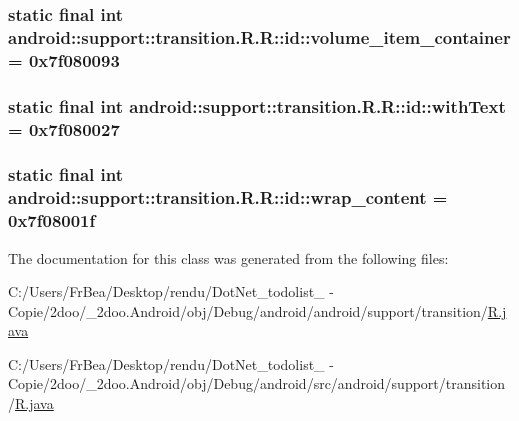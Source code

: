 \hypertarget{classandroid_1_1support_1_1transition_1_1_r_1_1id_21d2d46fae00ff6436e4c0553029a04f}{
\subsubsection[{volume\_\-item\_\-container}]{\setlength{\rightskip}{0pt plus 5cm}static final int android::support::transition.R.R::id::volume\_\-item\_\-container = 0x7f080093}}
\label{classandroid_1_1support_1_1transition_1_1_r_1_1id_21d2d46fae00ff6436e4c0553029a04f}


\hypertarget{classandroid_1_1support_1_1transition_1_1_r_1_1id_6375ca80242632bd4c6af11a41d4195a}{
\subsubsection[{withText}]{\setlength{\rightskip}{0pt plus 5cm}static final int android::support::transition.R.R::id::withText = 0x7f080027}}
\label{classandroid_1_1support_1_1transition_1_1_r_1_1id_6375ca80242632bd4c6af11a41d4195a}


\hypertarget{classandroid_1_1support_1_1transition_1_1_r_1_1id_cf6c3acdc0771c6321d570c2d6765396}{
\subsubsection[{wrap\_\-content}]{\setlength{\rightskip}{0pt plus 5cm}static final int android::support::transition.R.R::id::wrap\_\-content = 0x7f08001f}}
\label{classandroid_1_1support_1_1transition_1_1_r_1_1id_cf6c3acdc0771c6321d570c2d6765396}




The documentation for this class was generated from the following files:\begin{CompactItemize}
\item 
C:/Users/FrBea/Desktop/rendu/DotNet\_\-todolist\_ - Copie/2doo/\_\-2doo.Android/obj/Debug/android/android/support/transition/\hyperlink{android_2support_2transition_2_r_8java}{R.java}\item 
C:/Users/FrBea/Desktop/rendu/DotNet\_\-todolist\_ - Copie/2doo/\_\-2doo.Android/obj/Debug/android/src/android/support/transition/\hyperlink{src_2android_2support_2transition_2_r_8java}{R.java}\end{CompactItemize}
